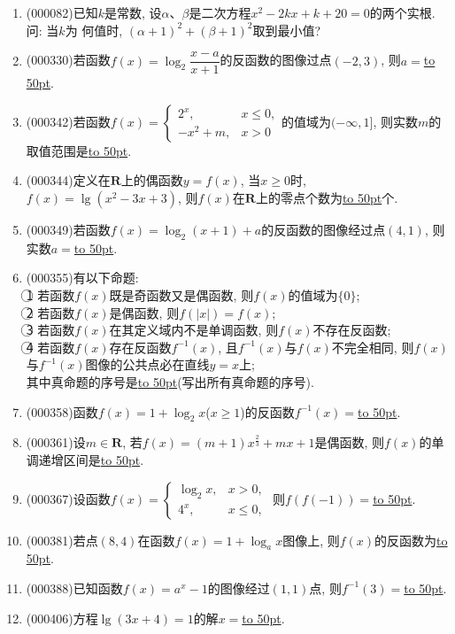 \documentclass[10pt,a4paper]{article}
\newcommand{\blank}[1]{\underline{\hbox to #1pt{}}}
\begin{document}
\begin{enumerate}[1.]

\item {\tiny (000082)}已知$k$是常数, 设$\alpha$、$\beta$是二次方程$x^2-2kx+k+20=0$的两个实根. 问: 当$k$为
何值时, $(\alpha+1)^2+(\beta+1)^2$取到最小值?
\item {\tiny (000330)}若函数$f(x)=\log_2\dfrac{x-a}{x+1}$的反函数的图像过点$(-2,3)$, 则$a=$\blank{50}.
\item {\tiny (000342)}若函数$f(x)=\begin{cases}    2^x, & x\le 0, \\ -x^2+m, & x>0 \end{cases}$的值域为$(-\infty ,1]$, 则实数$m$的取值范围是\blank{50}.
\item {\tiny (000344)}定义在$\mathbf{R}$上的偶函数$y=f(x)$, 当$x\ge 0$时, $f(x)=\lg (x^2-3x+3)$, 则$f(x)$在$\mathbf{R}$上的零点个数为\blank{50}个.
\item {\tiny (000349)}若函数$f(x)=\log_2 (x+1)+a$的反函数的图像经过点$(4,1)$, 则实数$a=$\blank{50}.
\item {\tiny (000355)}有以下命题:\\
\textcircled{1} 若函数$f(x)$既是奇函数又是偶函数, 则$f(x)$的值域为$\{0\}$; \\
\textcircled{2} 若函数$f(x)$是偶函数, 则$f(|x|)=f(x)$;\\
\textcircled{3} 若函数$f(x)$在其定义域内不是单调函数, 则$f(x)$不存在反函数;\\
\textcircled{4} 若函数$f(x)$存在反函数${{f}^{-1}}(x)$, 且${{f}^{-1}}(x)$与$f(x)$不完全相同, 则$f(x)$与${{f}^{-1}}(x)$图像的公共点必在直线$y=x$上; \\
其中真命题的序号是\blank{50}(写出所有真命题的序号).
\item {\tiny (000358)}函数$f(x)=1+\log_2 x$($x\ge 1$)的反函数$f^{-1}(x)=$\blank{50}.
\item {\tiny (000361)}设$m\in \mathbf{R}$, 若$f(x)=(m+1)x^{\tfrac{2}{3}}+mx+1$是偶函数, 则$f(x)$的单调递增区间是\blank{50}.
\item {\tiny (000367)}设函数$f(x)=\begin{cases}\log_2 x, & x>0, \\ 4^x, & x\le 0,\end{cases}$ 则$f(f(-1))=$\blank{50}.
\item {\tiny (000381)}若点$(8,4)$在函数$f(x)=1+\log_a x$图像上, 则$f(x)$的反函数为\blank{50}.
\item {\tiny (000388)}已知函数$f(x)=a^x-1$的图像经过$(1,1)$点, 则$f^{-1}(3)=$\blank{50}.
\item {\tiny (000406)}方程$\lg (3x+4)=1$的解$x=$\blank{50}.

\end{enumerate}
\end{document}
